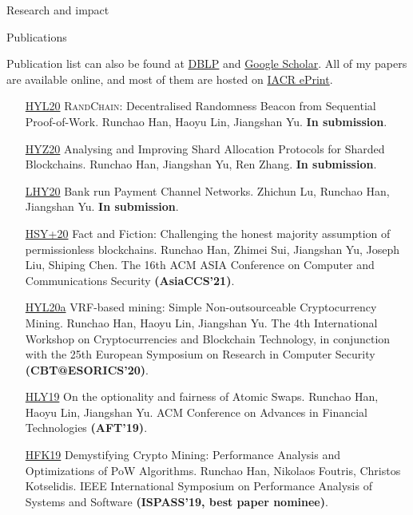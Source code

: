 \documentclass{resume} %
\begin{document}
\begin{rSection}{Research and impact}
\end{rSection}



\begin{rSection}{Publications}

    Publication list can also be found at \href{https://dblp.org/pers/hd/h/Han:Runchao}{DBLP} and \href{http://scholar.google.com/citations?user=xbpDocQAAAAJ&hl=en}{Google Scholar}.
    All of my papers are available online, and most of them are hosted on \href{https://eprint.iacr.org/}{IACR ePrint}.

    \begin{itemize}
        \item[\href{https://eprint.iacr.org/2020/1033}{HYL20}] \textsc{RandChain}: Decentralised Randomness Beacon from Sequential Proof-of-Work. Runchao Han, Haoyu Lin, Jiangshan Yu. \textbf{In submission}.
        \item[\href{https://eprint.iacr.org/2020/943}{HYZ20}] Analysing and Improving Shard Allocation Protocols for Sharded Blockchains. Runchao Han, Jiangshan Yu, Ren Zhang. \textbf{In submission}.
        \item[\href{https://eprint.iacr.org/2020/456.pdf}{LHY20}] Bank run Payment Channel Networks. Zhichun Lu, Runchao Han, Jiangshan Yu. \textbf{In submission}.
        \item[\href{https://eprint.iacr.org/2019/752}{HSY+20}] Fact and Fiction: Challenging the honest majority assumption of permissionless blockchains. Runchao Han, Zhimei Sui, Jiangshan Yu, Joseph Liu, Shiping Chen. The 16th ACM ASIA Conference on Computer and Communications Security \textbf{(AsiaCCS'21)}.
        \item[\href{https://github.com/DEX-ware/vrf-mining/blob/master/paper/main.pdf}{HYL20a}] VRF-based mining: Simple Non-outsourceable Cryptocurrency Mining. Runchao Han, Haoyu Lin, Jiangshan Yu. The 4th International Workshop on Cryptocurrencies and Blockchain Technology, in conjunction with the 25th European Symposium on Research in Computer Security \textbf{(CBT@ESORICS'20)}.
        \item[\href{https://eprint.iacr.org/2019/896}{HLY19}] On the optionality and fairness of Atomic Swaps. Runchao Han, Haoyu Lin, Jiangshan Yu.  ACM Conference on Advances in Financial Technologies \textbf{(AFT'19)}.
        \item[\href{https://www.research.manchester.ac.uk/portal/files/85753741/paper.pdf}{HFK19}] Demystifying Crypto Mining: Performance Analysis and Optimizations of PoW Algorithms. Runchao Han, Nikolaos Foutris, Christos Kotselidis. IEEE International Symposium on Performance Analysis of Systems and Software \textbf{(ISPASS'19, best paper nominee)}.

\end{itemize}
\end{rSection}
\end{document}

